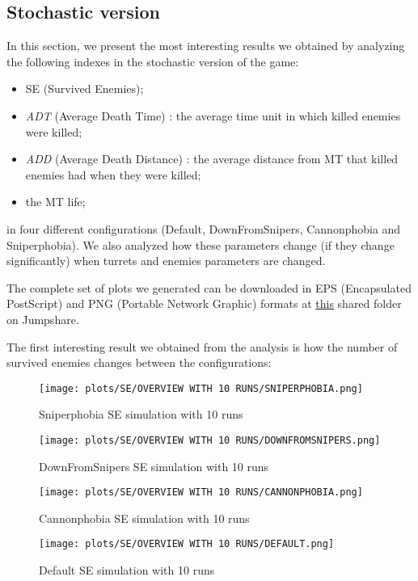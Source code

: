 \documentclass[
10pt, %
a4paper, %
oneside, %
headinclude,footinclude, %
BCOR5mm, %
]{scrartcl}
\begin{document}
		\subsection{Stochastic version}
			In this section, we present the most interesting results we obtained by analyzing the following indexes in the stochastic version of the game:
			\begin{itemize}
				\item SE (Survived Enemies);
				\item \emph{ADT} (Average Death Time) : the average time unit in which killed enemies were killed;
				\item \emph{ADD} (Average Death Distance) : the average distance from MT that killed enemies had when they were killed;
				\item the MT life;
			\end{itemize}
			in four different configurations (Default, DownFromSnipers, Cannonphobia and Sniperphobia). We also analyzed how these parameters change (if they change significantly) when turrets and enemies parameters are changed.
			
			The complete set of plots we generated can be downloaded in EPS (Encapsulated PostScript) and PNG (Portable Network Graphic) formats at \href{https://jmp.sh/0LxAWLjY}{this} shared folder on Jumpshare.
			
			The first interesting result we obtained from the analysis is how the number of survived enemies changes between the configurations:
			\begin{figure}[H]
				\centering
				\begin{minipage}{.45\textwidth}
					\centering
					\texttt{[image: plots/SE/OVERVIEW WITH 10 RUNS/SNIPERPHOBIA.png]}
					\caption{Sniperphobia SE simulation with 10 runs}
				\end{minipage}
				\begin{minipage}{.45\textwidth}
					\centering
					\texttt{[image: plots/SE/OVERVIEW WITH 10 RUNS/DOWNFROMSNIPERS.png]}
					\caption{DownFromSnipers SE simulation with 10 runs}
				\end{minipage}
			\end{figure}
			\begin{figure}[h!]
				\centering
				\begin{minipage}{.45\textwidth}
					\centering
					\texttt{[image: plots/SE/OVERVIEW WITH 10 RUNS/CANNONPHOBIA.png]}
					\caption{Cannonphobia SE simulation with 10 runs}
				\end{minipage}
				\begin{minipage}{.45\textwidth}
					\centering
					\texttt{[image: plots/SE/OVERVIEW WITH 10 RUNS/DEFAULT.png]}
					\caption{Default SE simulation with 10 runs}
				\end{minipage}
			\end{figure}
			
\end{document}
